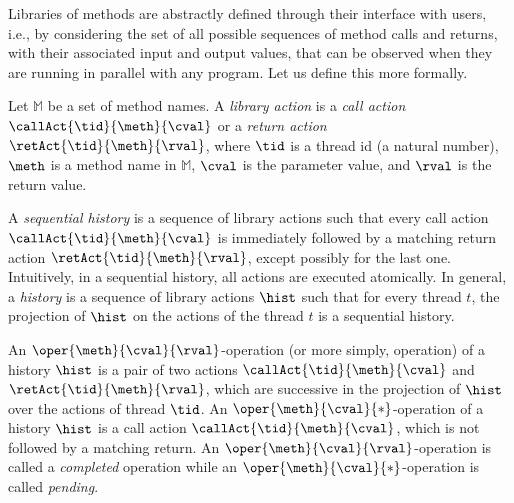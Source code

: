Libraries of methods are abstractly defined through their interface with users, i.e., by considering the set of all possible sequences of method calls and returns, with their associated input and output values, that can be observed when they are running in parallel with any program. Let us define this more formally.

Let $\mathbb{M}$ be a set of method names. 
A \emph{library action} is a 
\emph {call action} $\callAct{\tid}{\meth}{\cval}$
or a \emph{return action} $\retAct{\tid}{\meth}{\rval}$,
where $\tid$ is a thread id (\ie a natural number), $\meth$ is a method name in $\mathbb{M}$, $\cval$ is the parameter value,
and $\rval$ is the return value. 

A \emph{sequential history} is a sequence of library actions such that every call action $\callAct{\tid}{\meth}{\cval}$ is immediately followed by a matching return action 
$\retAct{\tid}{\meth}{\rval}$, %
except possibly for the last one.
Intuitively, in a sequential history, all actions are executed atomically.
%
In general, a \emph{history} is a sequence of library actions $\hist$ such that %
for every thread $t$, the projection of $\hist$ on the actions of the thread $t$ is a sequential history. 


An $\oper{\meth}{\cval}{\rval}$-operation (or more simply, operation) of a history $\hist$ is a pair of two actions $\callAct{\tid}{\meth}{\cval}$ and $\retAct{\tid}{\meth}{\rval}$, which are successive in the projection of $\hist$ over the actions of thread $\tid$. An $\oper{\meth}{\cval}{*}$-operation of a history $\hist$ is a call action $\callAct{\tid}{\meth}{\cval}$, which is not followed by a matching return. An $\oper{\meth}{\cval}{\rval}$-operation is called a \emph{completed} operation while an $\oper{\meth}{\cval}{*}$-operation is called \emph{pending}.


